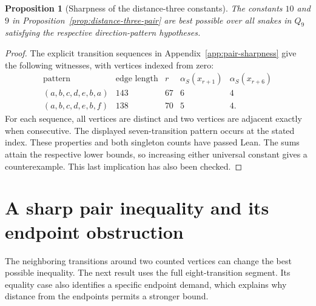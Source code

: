 \documentclass[11pt,a4paper]{article}
\newtheorem{proposition}[theorem]{Proposition}
\theoremstyle{definition}
\theoremstyle{remark}
\newcommand{\Q}{Q}
\begin{document}
\begin{proposition}[Sharpness of the distance-three constants]\label{prop:pair-sharpness}
The constants $10$ and $9$ in Proposition~\ref{prop:distance-three-pair} are best possible over all snakes in $\Q_9$ satisfying the respective direction-pattern hypotheses.
\end{proposition}
\begin{proof}
The explicit transition sequences in Appendix~\ref{app:pair-sharpness} give the following witnesses, with vertices indexed from zero:
\[
\begin{array}{c|c|c|c|c}
\text{pattern}&\text{edge length}&r&\alpha_S(x_{r+1})&\alpha_S(x_{r+6})\\\hline
(a,b,c,d,e,b,a)&143&67&6&4\\
(a,b,c,d,e,b,f)&138&70&5&4.
\end{array}
\]
For each sequence, all vertices are distinct and two vertices are adjacent exactly when consecutive. The displayed seven-transition pattern occurs at the stated index. These properties and both singleton counts have passed Lean. The sums attain the respective lower bounds, so increasing either universal constant gives a counterexample. This last implication has also been checked.
\end{proof}


\section{A sharp pair inequality and its endpoint obstruction}\label{sec:endpoint-pair}
The neighboring transitions around two counted vertices can change the best possible inequality. The next result uses the full eight-transition segment. Its equality case also identifies a specific endpoint demand, which explains why distance from the endpoints permits a stronger bound.
\end{document}
